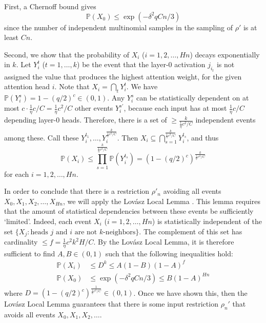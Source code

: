 \documentclass[11pt,a4paper]{article}
\newcommand{\Prob}{\mathbb{P}}%
\begin{document}
First, a Chernoff bound gives~\cite[Theorem 4.4]{mitzenmacherprobability}
\begin{equation}
\Prob(X_0) \leq    \exp\left(-\delta^2qCn / 3\right)
\end{equation}
since the number of independent multinomial samples in the sampling of $\rho'$ is at least $Cn$.

Second, we show that the probability of $X_i$ ($i=1,2,\dots, Hn$) decays exponentially in $k$.
Let $Y_i^t$ ($t=1,\dots,k$) be the event that the layer-0 activation $j_{i_t}$ is not assigned the value that produces the highest attention weight, for the given attention head $i$.
Note that $X_i = \bigcap_t Y_i^t$.
We have $\Prob(Y_i^s) = 1-(q/2)^c \in (0,1)$. %
Any $Y_i^s$ can be statistically dependent on at most $c \cdot \frac{1}{\eta}c/C = \frac{1}{\eta}c^2/C$ other events $Y_i^{s'}$, because each input has at most $\frac{1}{\eta} c/C$ depending layer-0 heads.
Therefore, there is a set of $\geq \frac{k}{\frac{1}{\eta}c^2/C}$ independent events among these.
Call these $Y_i^{t_1}, \dots, Y_i^{\frac{k}{\frac{1}{\eta}c^2/C}}$.
Then $X_i \subseteq \bigcap_{s=1}^{\frac{k}{\frac{1}{\eta}c^2/C}} Y_i^{t_s}$, and thus
\begin{equation}
\Prob(X_i) \leq \prod_{s=1}^{\frac{k}{\frac{1}{\eta}c^2/C}} \Prob(Y_i^{t_s}) = \left(1-(q/2)^c\right)^{\frac{k}{\frac{1}{\eta}c^2/C}}
\end{equation}
for each $i=1, 2, \dots, Hn$.

In order to conclude that there is a restriction $\rho'_n$ avoiding all events $X_0, X_1, X_2, \dots, X_{Hn}$, we will apply the Lov{\'a}sz Local Lemma \cite[Theorem 6.17]{mitzenmacherprobability}.
This lemma requires that the amount of statistical dependencies between these events be sufficiently `limited'.
Indeed, each event $X_i$ ($i=1,2,\dots, Hn$) is statistically independent of the set $\{X_j : \text{heads } j \text{ and } i \text{ are not $k$-neighbors}\}$.
The complement of this set has cardinality $\leq f= \frac{1}{\eta}c^2k^2H/C$.
By the Lov{\'a}sz Local Lemma, it is therefore sufficient to find  $A, B \in (0,1)$ such that the following inequalities hold: %
\begin{align}\label{eq:lovasz-1}
\Prob(X_i) &\leq  D^k \leq A(1-B)(1-A)^{f} \\ \label{eq:lovasz-2}
\Prob(X_0) &\leq \exp\left(-\delta^2qCn/3\right)  \leq B (1-A)^{Hn}
\end{align}
where $D =  \left(1-(q/2)^c\right)^{\frac{1}{\frac{1}{\eta}c^2/C}} \in (0,1)$.
Once we have shown this, then the Lov{\'a}sz Local Lemma guarantees that there is some input restriction $\rho_n'$ that avoids all events $X_0, X_1, X_2, \dots$.
\end{document}
